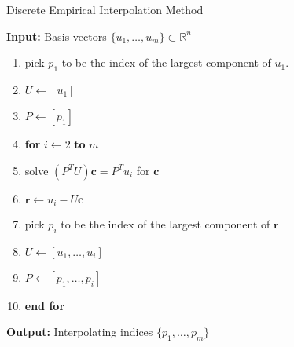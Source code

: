 \begin{algorithm} 
\caption{Discrete Empirical Interpolation Method} \label{alg:MoOr:1}
{\bf Input:}  Basis vectors $\{u_1,\dots , u_m\}\subset \mathbb R^n$
\begin{enumerate}
\item pick $p_1$ to be the index of the largest component of $u_1$.
\item $U \leftarrow [u_1]$
\item $P \leftarrow [p_1]$
\item \textbf{for} $i\leftarrow 2$ \textbf{to} $m$
\item \hspace{0.5cm} solve $(P^TU)\mathbf c = P^T u_i$ for $\mathbf c$
\item \hspace{0.5cm} $\mathbf r \leftarrow u_i - U\mathbf c$
\item \hspace{0.5cm} pick $p_i$ to be the index of the largest component of $\mathbf r$
\item \hspace{0.5cm} $U \leftarrow [u_1,\dots,u_i]$
\item \hspace{0.5cm} $P \leftarrow [p_1,\dots,p_i]$
\item \textbf{end for}
\end{enumerate}
\vspace{0.5cm}
{\bf Output:} Interpolating indices $\{p_1,\dots,p_m\}$
\end{algorithm}


